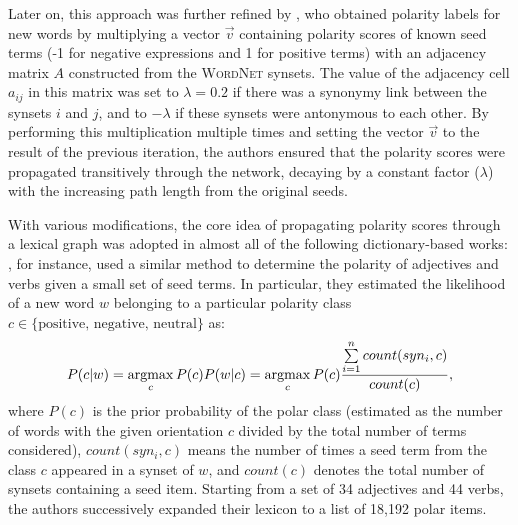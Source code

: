 Later on, this approach was further refined by
\citet{Blair-Goldensohn:08}, who obtained polarity labels for new
words by multiplying a vector $\vec{v}$ containing polarity scores of
known seed terms (-1 for negative expressions and 1 for positive
terms) with an adjacency matrix $A$ constructed from the
\textsc{WordNet} synsets.  The value of the adjacency cell $a_{ij}$ in
this matrix was set to $\lambda=0.2$ if there was a synonymy link
between the synsets $i$ and $j$, and to $-\lambda$ if these synsets
were antonymous to each other.  By performing this multiplication
multiple times and setting the vector $\vec{v}$ to the result of the
previous iteration, the authors ensured that the polarity scores were
propagated transitively through the network, decaying by a constant
factor ($\lambda$) with the increasing path length from the original
seeds.%

With various modifications, the core idea of propagating polarity
scores through a lexical graph was adopted in almost all of the
following dictionary-based works: \citet{Kim:04,Kim:06}, for instance,
used a similar method to determine the polarity of adjectives and
verbs given a small set of seed terms.  In particular, they estimated
the likelihood of a new word $w$ belonging to a particular polarity
class $c \in \{\textrm{positive, negative, neutral}\}$ as:
\begin{equation*}
  P(c|w) = \argmax_{c}P(c)P(w|c) = \argmax_{c}P(c)\frac{\sum\limits_{i=1}^{n}count(syn_i, c)}{count(c)},
\end{equation*}
where $P(c)$ is the prior probability of the polar class (estimated as
the number of words with the given orientation $c$ divided by the
total number of terms considered), $count(syn_i, c)$ means the number
of times a seed term from the class $c$ appeared in a synset of $w$,
and $count(c)$ denotes the total number of synsets containing a seed
item.  Starting from a set of 34 adjectives and 44 verbs, the authors
successively expanded their lexicon to a list of 18,192 polar
items. %

